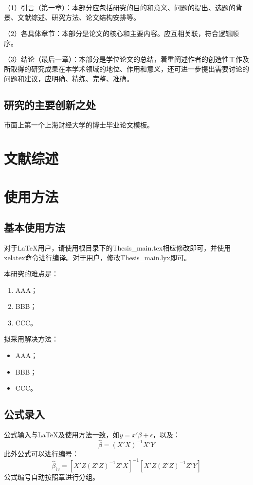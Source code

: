 \documentclass{sufethesismas}
\begin{document}
（1）引言（第一章）：本部分应包括研究的目的和意义、问题的提出、选题的背景、文献综述、研究方法、论文结构安排等。

（2）各具体章节：本部分是论文的核心和主要内容。应互相关联，符合逻辑顺序。

（3）结论（最后一章）：本部分是学位论文的总结，着重阐述作者的创造性工作及所取得的研究成果在本学术领域的地位、作用和意义，还可进一步提出需要讨论的问题和建议，应明确、精练、完整、准确。


\section{研究的主要创新之处}

市面上第一个上海财经大学的博士毕业论文模板。


\chapter{文献综述}


\chapter{使用方法}


\section{基本使用方法}

对于\LaTeX{}用户，请使用根目录下的Thesis\_main.tex相应修改即可，并使用xelatex命令进行编译。对于用户，修改Thesis\_main.lyx即可。


本研究的难点是：
\begin{enumerate}
	\item AAA；
	\item BBB；
	\item CCC。
\end{enumerate}

拟采用解决方法：
\begin{itemize}
	\item AAA；
	\item BBB；
	\item CCC。
\end{itemize}


\section{公式录入}

公式输入与\LaTeX{}及使用方法一致，如$y=x'\beta+\epsilon$，以及：
\[
\hat{\beta}=\left(X'X\right)^{-1}X'Y
\]
此外公式可以进行编号：
\begin{equation}
\hat{\beta}_{iv}=\left[X'Z\left(Z'Z\right)^{-1}Z'X\right]^{-1}\left[X'Z\left(Z'Z\right)^{-1}Z'Y\right]
\end{equation}
公式编号自动按照章进行分组。
\end{document}
